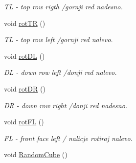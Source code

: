 \begin{DoxyCompactItemize}
\begin{DoxyCompactList}\small\item\em TL -\/ top row rigth /gornji red nadesno. \end{DoxyCompactList}\item 
void \hyperlink{classGLWidget_a5a01f3c15613006689a235c6d359e04e}{rot\+TR} ()\hypertarget{classGLWidget_a5a01f3c15613006689a235c6d359e04e}{}\label{classGLWidget_a5a01f3c15613006689a235c6d359e04e}

\begin{DoxyCompactList}\small\item\em TL -\/ top row left /gornji red nalevo. \end{DoxyCompactList}\item 
void \hyperlink{classGLWidget_a37bbcfb8900d5f5e9026771c8af65ed3}{rot\+DL} ()\hypertarget{classGLWidget_a37bbcfb8900d5f5e9026771c8af65ed3}{}\label{classGLWidget_a37bbcfb8900d5f5e9026771c8af65ed3}

\begin{DoxyCompactList}\small\item\em DL -\/ down row left /donji red nalevo. \end{DoxyCompactList}\item 
void \hyperlink{classGLWidget_a5880e4ead683bb63b31c46e510277999}{rot\+DR} ()\hypertarget{classGLWidget_a5880e4ead683bb63b31c46e510277999}{}\label{classGLWidget_a5880e4ead683bb63b31c46e510277999}

\begin{DoxyCompactList}\small\item\em DR -\/ down row right /donji red nadesno. \end{DoxyCompactList}\item 
void \hyperlink{classGLWidget_ac2b729607891cdf32da594f37e970197}{rot\+FL} ()\hypertarget{classGLWidget_ac2b729607891cdf32da594f37e970197}{}\label{classGLWidget_ac2b729607891cdf32da594f37e970197}

\begin{DoxyCompactList}\small\item\em FL -\/ front face left / nalicje rotiraj nalevo. \end{DoxyCompactList}\item 
void \hyperlink{classGLWidget_a7799035981c6459c315ca0e554a91e2e}{Random\+Cube} ()
\end{DoxyCompactItemize}
